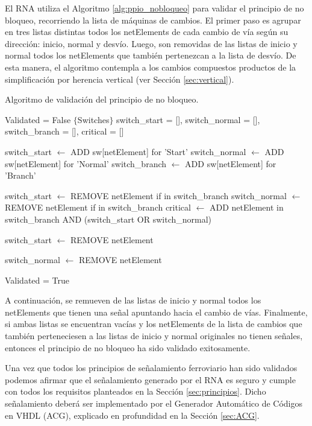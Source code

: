 		El RNA utiliza el Algoritmo \ref{alg:ppio_nobloqueo} para validar el principio de no bloqueo, recorriendo la lista de máquinas de cambios. El primer paso es agrupar en tres listas distintas todos los netElements de cada cambio de vía según su dirección: inicio, normal y desvío. Luego, son removidas de las listas de inicio y normal todos los netElements que también pertenezcan a la lista de desvío. De esta manera, el algoritmo contempla a los cambios compuestos productos de la simplificación por herencia vertical (ver Sección \ref{sec:vertical}). 
		
		\begin{algorithm}[H]
			\caption{Algoritmo de validación del principio de no bloqueo.}\label{alg:ppio_nobloqueo}
			\DontPrintSemicolon
			\SetNoFillComment
			\LinesNotNumbered 
			Validated = False\;
			$\{$Switches$\}$\;
			switch\_start = [], switch\_normal = [], switch\_branch = [], critical = []\;
			
			
			{
				switch\_start $\leftarrow$ ADD sw[netElement] for 'Start'\;
				switch\_normal $\leftarrow$ ADD sw[netElement] for 'Normal'\;
				switch\_branch $\leftarrow$ ADD sw[netElement] for 'Branch'\;
			}	
			
			{
				switch\_start $\leftarrow$ REMOVE netElement if in switch\_branch\;
				switch\_normal $\leftarrow$ REMOVE netElement if in switch\_branch\;
				critical $\leftarrow$ ADD netElement in switch\_branch AND (switch\_start OR switch\_normal)\;
			}	
			
			{
				{
					switch\_start $\leftarrow$ REMOVE netElement\;
				}
				
				{
					switch\_normal $\leftarrow$ REMOVE netElement\;
				}
			}
			
			{
				Validated = True\;
			}
			
		\end{algorithm}
		
		A continuación, se remueven de las listas de inicio y normal todos los netElements que tienen una señal apuntando hacia el cambio de vías. Finalmente, si ambas listas se encuentran vacías y los netElements de la lista de cambios que también perteneciesen a las listas de inicio y normal originales no tienen señales, entonces el principio de no bloqueo ha sido validado exitosamente.
		
	Una vez que todos los principios de señalamiento ferroviario han sido validados podemos afirmar que el señalamiento generado por el RNA es seguro y cumple con todos los requisitos planteados en la Sección \ref{sec:principios}. Dicho señalamiento deberá ser implementado por el Generador Automático de Códigos en VHDL (ACG), explicado en profundidad en la Sección \ref{sec:ACG}.
